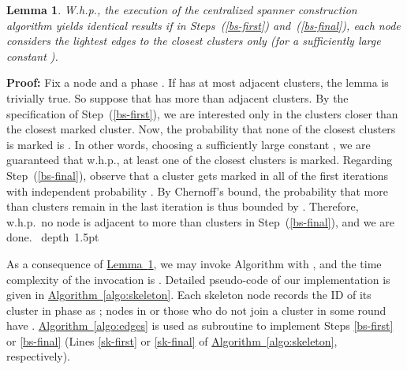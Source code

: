 \documentclass[letterpaper,11pt]{article}
\newcommand{\namedref}[2]{\hyperref[#2]{#1~\ref*{#2}}}
\newcommand{\lemmaref}[1]{\namedref{Lemma}{#1}}
\newcommand{\algref}[1]{\namedref{Algorithm}{#1}}
\newtheorem{lemma}[theorem]{Lemma}
\newcommand{\blackslug}{\hbox{\hskip 1pt \vrule width 4pt height 8pt
depth 1.5pt \hskip 1pt}}
\newcommand{\QED}{\quad\blackslug\lower 8.5pt\null\par}
\newenvironment{proof}[1][Proof:]{\noindent \textbf{#1}\xspace}{\QED}
\begin{document}
\begin{lemma}\label{lem-reduce}
  W.h.p., the execution of the centralized spanner construction
  algorithm yields identical results if in Steps~(\ref{bs-first})
  and~(\ref{bs-final}), each node considers the lightest edges to the
   closest clusters only (for a sufficiently large
  constant ).
\end{lemma}
\begin{proof}
Fix a node  and a phase . If  has at most 
adjacent clusters, the lemma is trivially true. So suppose that  has more
than  adjacent clusters. By the specification of
Step~(\ref{bs-first}), we are interested only in the clusters closer than the
closest marked cluster. Now, the probability that none of the closest
 clusters is marked is . In other words, choosing a sufficiently large constant
, we are guaranteed that w.h.p., at least one of the closest
 clusters is marked. Regarding Step~(\ref{bs-final}),
observe that a cluster gets marked in all of the first  iterations with
independent probability . By Chernoff's bound, the probability
that more than  clusters remain in the last iteration is
thus bounded by . Therefore, w.h.p.\ no
node is adjacent to more than  clusters in
Step~(\ref{bs-final}), and we are done.
\end{proof}
As a consequence of \lemmaref{lem-reduce}, we may invoke Algorithm  with
, and the time complexity of the invocation is
. Detailed pseudo-code of our implementation
is given in \algref{algo:skeleton}. Each skeleton node  records the ID
of its cluster in phase  as ; nodes in  or those who do
not join a cluster in some round  have . \algref{algo:edges} is
used as subroutine to implement Steps \eqref{bs-first} or \eqref{bs-final}
(Lines \ref{sk-first} or \ref{sk-final} of \algref{algo:skeleton},
respectively).
\end{document}
